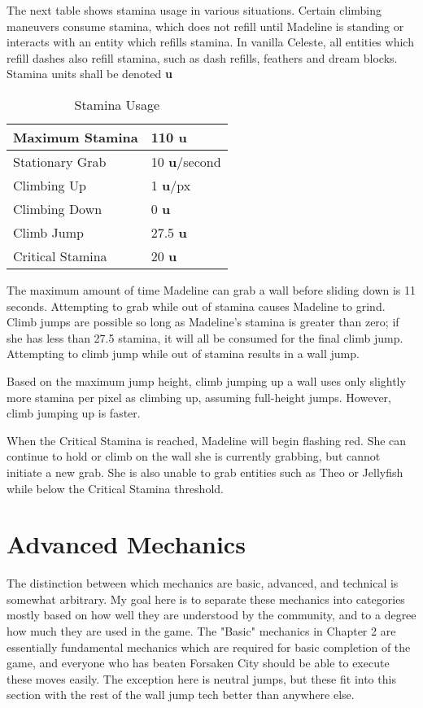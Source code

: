 \documentclass[oneside]{book}
\newcommand{\su}{\textbf{u}}
\begin{document}
The next table shows stamina usage in various situations. Certain climbing maneuvers consume stamina, which does not refill until Madeline is standing or interacts with an entity which refills stamina. In vanilla Celeste, all entities which refill dashes also refill stamina, such as dash refills, feathers and dream blocks. Stamina units shall be denoted  \su

\begin{table}[h]
\begin{tabular}{|l|l|}
\hline
Maximum Stamina&110 \su\\
\hline
Stationary Grab&10 \su/second\\
\hline
Climbing Up&1 \su/px\\
\hline
Climbing Down&0 \su\\
\hline
Climb Jump&27.5 \su\\
\hline
Critical Stamina&20 \su\\
\hline
\end{tabular}
\caption{Stamina Usage}
\end{table}

The maximum amount of time Madeline can grab a wall before sliding down is 11 seconds. Attempting to grab while out of stamina causes Madeline to grind. Climb jumps are possible so long as Madeline's stamina is greater than zero; if she has less than 27.5 stamina, it will all be consumed for the final climb jump. Attempting to climb jump while out of stamina results in a wall jump.

Based on the maximum jump height, climb jumping up a wall uses only slightly more stamina per pixel as climbing up, assuming full-height jumps. However, climb jumping up is faster.

When the Critical Stamina is reached, Madeline will begin flashing red. She can continue to hold or climb on the wall she is currently grabbing, but cannot initiate a new grab. She is also unable to grab entities such as Theo or Jellyfish while below the Critical Stamina threshold.

\chapter{Advanced Mechanics}

The distinction between which mechanics are basic, advanced, and technical is somewhat arbitrary. My goal here is to separate these mechanics into categories mostly based on how well they are understood by the community, and to a degree how much they are used in the game. The "Basic" mechanics in Chapter 2 are essentially fundamental mechanics which are required for basic completion of the game, and everyone who has beaten Forsaken City should be able to execute these moves easily. The exception here is neutral jumps, but these fit into this section with the rest of the wall jump tech better than anywhere else.
\end{document}
